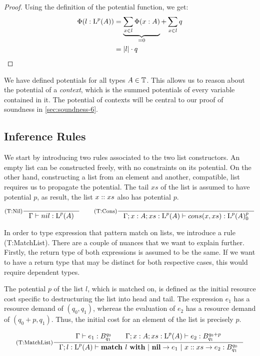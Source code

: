 \begin{proof}
   Using the definition of the potential function, we get:
   \begin{align*}
      \Phi(l : \text{L}^{p}(A)) &= \underbrace{\sum_{x \in l} \Phi(x : A)}_{=0} + \sum_{x \in l} q \\
                              &= |l| \cdot q
   \end{align*}
\end{proof}

We have defined potentials for all types \(A \in \mathbb{T}\). This allows us to reason about the potential of a \emph{context}, which is the summed potentials of every variable contained in it. The potential of contexts will be central to our proof of soundness in \cref{sec:soundness-6}.

\subsection{Inference Rules}

We start by introducing two rules associated to the two list constructors. An empty list can be constructed freely, with no constraints on its potential. On the other hand, constructing a list from an element and another, compatible, list requires us to propagate the potential. The tail \(xs\) of the list is assumed to have potential \(p\), as result, the list \(x :: xs\) also has potential \(p\). 

\[
   \inference[(T:Nil)]
   {}
   {\typing{\Gamma}{nil}{\ralist{p}{A}}}
   \qquad
   \inference[(T:Cons)]
   {}
   {\typing{\Gamma;x : A; xs : \ralist{p}{A}}{cons(x, xs)}{\ratype{\ralist{p}{A}}{p}{0}}}
\]

In order to type expression that pattern match on lists, we introduce a rule (T:MatchList). There are a couple of nuances that we want to explain further. Firstly, the return type of both expressions is assumed to be the same. If we want to have a return type that may be distinct for both respective cases, this would require dependent types. 

The potential \(p\) of the list \(l\), which is matched on, is defined as the initial resource cost specific to destructuring the list into head and tail. The expression \(e_1\) has a resource demand of \((q_0, q_1)\), whereas the evaluation of \(e_2\) has a resource demand of \((q_0 + p, q_1)\). Thus, the initial cost for an element of the list is precisely \(p\).  

\[
   \inference[(T:MatchList)]
   {\typing{\Gamma}{e_1}{\ratype{B}{q_0}{q_1}} \qquad \typing{\Gamma;x : A; xs : \ralist{p}{A}}{e_2}{\ratype{B}{q_0 + p}{q_1}}}
   {\typing{\Gamma;l : \ralist{p}{A}}{\listmatch{l}{e_1}{e_2}}{\ratype{B}{q_0}{q_1}}}
\]

